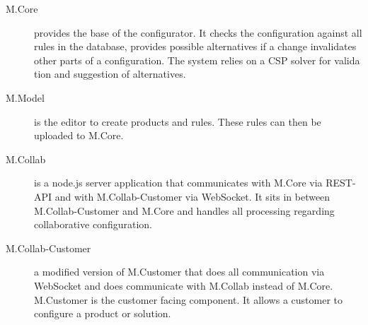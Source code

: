 \begin{description}
    \item[M.Core] provides the base of the configurator. It checks the configuration against all rules in the database, provides possible alternatives if a change invalidates other parts of a configuration. The system relies on a CSP solver for valida tion and suggestion of alternatives.
    \item[M.Model] is the editor to create products and rules. These rules can then be uploaded to M.Core.
    \item[M.Collab] is a node.js server application that communicates with M.Core via REST-API and with M.Collab-Customer via WebSocket. It sits in between M.Collab-Customer and M.Core and handles all processing regarding collaborative configuration.
    \item[M.Collab-Customer] a modified version of M.Customer that does all communication via WebSocket and does communicate with M.Collab instead of M.Core. M.Customer is the customer facing component. It allows a customer to configure a product or solution.
\end{description}



